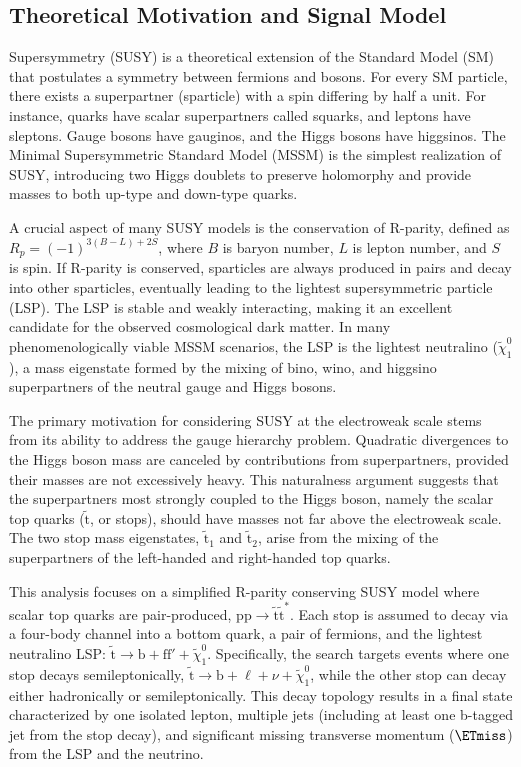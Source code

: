 \subsection{Theoretical Motivation and Signal Model}
Supersymmetry (SUSY) is a theoretical extension of the Standard Model (SM) that postulates a symmetry between fermions and bosons. For every SM particle, there exists a superpartner (sparticle) with a spin differing by half a unit. For instance, quarks have scalar superpartners called squarks, and leptons have sleptons. Gauge bosons have gauginos, and the Higgs bosons have higgsinos. The Minimal Supersymmetric Standard Model (MSSM) is the simplest realization of SUSY, introducing two Higgs doublets to preserve holomorphy and provide masses to both up-type and down-type quarks.

A crucial aspect of many SUSY models is the conservation of R-parity, defined as $R_p = (-1)^{3(B-L)+2S}$, where $B$ is baryon number, $L$ is lepton number, and $S$ is spin. If R-parity is conserved, sparticles are always produced in pairs and decay into other sparticles, eventually leading to the lightest supersymmetric particle (LSP). The LSP is stable and weakly interacting, making it an excellent candidate for the observed cosmological dark matter. In many phenomenologically viable MSSM scenarios, the LSP is the lightest neutralino ($\tilde{\chi}_1^0$), a mass eigenstate formed by the mixing of bino, wino, and higgsino superpartners of the neutral gauge and Higgs bosons.

The primary motivation for considering SUSY at the electroweak scale stems from its ability to address the gauge hierarchy problem. Quadratic divergences to the Higgs boson mass are canceled by contributions from superpartners, provided their masses are not excessively heavy. This naturalness argument suggests that the superpartners most strongly coupled to the Higgs boson, namely the scalar top quarks ($\tilde{\mathrm{t}}$, or stops), should have masses not far above the electroweak scale. The two stop mass eigenstates, $\tilde{\mathrm{t}}_1$ and $\tilde{\mathrm{t}}_2$, arise from the mixing of the superpartners of the left-handed and right-handed top quarks.

This analysis focuses on a simplified R-parity conserving SUSY model where scalar top quarks are pair-produced, $\mathrm{pp} \to \tilde{\mathrm{t}}\tilde{\mathrm{t}}^*$. Each stop is assumed to decay via a four-body channel into a bottom quark, a pair of fermions, and the lightest neutralino LSP: $\tilde{\mathrm{t}} \to \mathrm{b} + \mathrm{f}\mathrm{f}' + \tilde{\chi}_1^0$. Specifically, the search targets events where one stop decays semileptonically, $\tilde{\mathrm{t}} \to \mathrm{b} + \ell + \nu + \tilde{\chi}_1^0$, while the other stop can decay either hadronically or semileptonically. This decay topology results in a final state characterized by one isolated lepton, multiple jets (including at least one b-tagged jet from the stop decay), and significant missing transverse momentum ($\ETmiss$) from the LSP and the neutrino.

